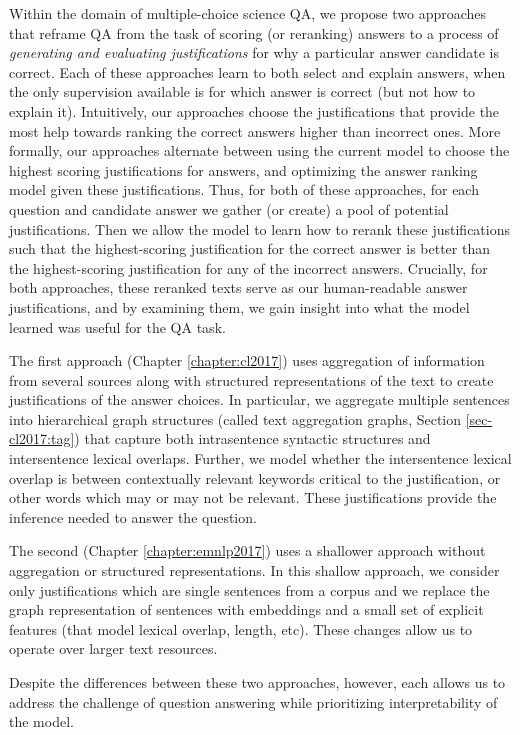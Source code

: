Within the domain of multiple-choice science QA, we propose two approaches that reframe QA from the task of scoring (or reranking) answers to a process of \emph{generating and evaluating justifications} for why a particular answer candidate is correct.  
Each of these approaches learn to both select and explain answers, when the only supervision available is for which answer is correct (but not how to explain it).
Intuitively, our approaches choose the justifications that provide the most help towards ranking the correct answers higher than incorrect ones.  
More formally, our approaches alternate between using the current model to choose the highest scoring justifications for answers, and optimizing the answer ranking model given these justifications. 
Thus, for both of these approaches, for each question and candidate answer we gather (or create) a pool of potential justifications.  Then we allow the model to learn how to rerank these justifications such that the highest-scoring justification for the correct answer is better than the highest-scoring justification for any of the incorrect answers.   
Crucially, for both approaches, these reranked texts serve as our human-readable answer justifications, and by examining them, we gain insight into what the model learned was useful for the QA task. 

The first approach (Chapter \ref{chapter:cl2017}) uses aggregation of information from several sources along with structured representations of the text to create justifications of the answer choices.  
In particular, we aggregate multiple sentences into hierarchical graph structures (called text aggregation graphs, Section \ref{sec-cl2017:tag}) that capture both intrasentence syntactic structures and intersentence lexical overlaps. 
Further, we model whether the intersentence lexical overlap is between contextually relevant keywords critical to the justification, or other words which may or may not be relevant. These justifications provide the inference needed to answer the question.

The second (Chapter \ref{chapter:emnlp2017}) uses a shallower approach without aggregation or structured representations.  In this shallow approach, we consider only justifications which are single sentences from a corpus and we replace the graph representation of sentences with embeddings and a small set of explicit features (that model lexical overlap, length, etc).  These changes allow us to operate over larger text resources.  

Despite the differences between these two approaches, however, each allows us to address the challenge of question answering while prioritizing interpretability of the model.

